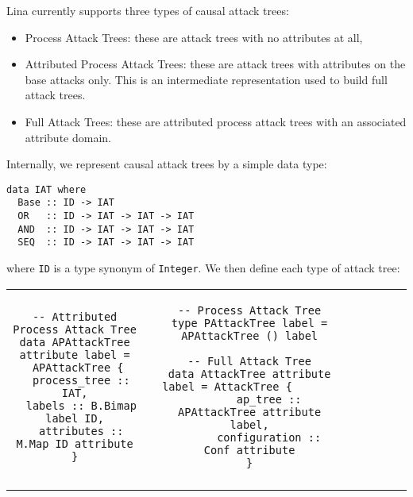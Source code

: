 Lina currently supports three types of causal attack trees:
\begin{itemize}
\item Process Attack Trees: these are attack trees with no attributes
  at all,
  
\item Attributed Process Attack Trees: these are attack trees with
  attributes on the base attacks only.  This is an intermediate
  representation used to build full attack trees.
  
\item Full Attack Trees: these are attributed process attack trees
  with an associated attribute domain.
\end{itemize}
Internally, we represent causal attack trees by a simple data type:
\begin{center}
\begin{verbatim}
data IAT where
  Base :: ID -> IAT            
  OR   :: ID -> IAT -> IAT -> IAT
  AND  :: ID -> IAT -> IAT -> IAT
  SEQ  :: ID -> IAT -> IAT -> IAT   
\end{verbatim}
\end{center}
\newcommand{\mh}[1]{\texttt{#1}}
where \mh{ID} is a type synonym of \mh{Integer}.    We then define each type of attack tree:
\begin{tabular}{cccccccc}
  \\ 
  \begin{minipage}{2in}        
    \begin{verbatim}
-- Attributed Process Attack Tree
data APAttackTree attribute label =
 APAttackTree {
  process_tree :: IAT,
  labels :: B.Bimap label ID,
  attributes :: M.Map ID attribute
 } 
    \end{verbatim}
    \vspace{-2px}
  \end{minipage}  
  & \quad &
  \begin{minipage}{1in}        
    \begin{verbatim}
-- Process Attack Tree
type PAttackTree label = APAttackTree () label

-- Full Attack Tree
data AttackTree attribute label = AttackTree {            
      ap_tree :: APAttackTree attribute label,
      configuration :: Conf attribute
}
    \end{verbatim}
  \end{minipage}
  \\\\
\end{tabular}

